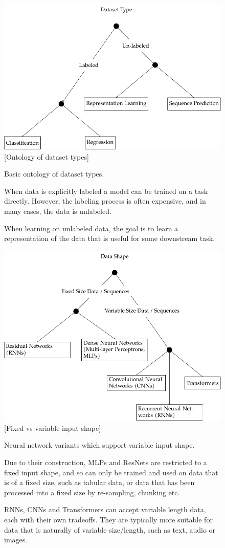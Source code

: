 \begin{figure}[h]
        \centering
        \includegraphics[width=.7\linewidth]{figures/ontology-2-task.pdf}
        \vspace{1cm}
        \captionsetup{parskip=7pt}
        [Ontology of dataset types]{
            Basic ontology of dataset types.

            When data is explicitly labeled a model can be trained on a task directly. However, the labeling process is often expensive, and in many cases, the data is unlabeled.

            When learning on unlabeled data, the goal is to learn a representation of the data that is useful for some downstream task.
        }
        \label{fig:ontology-task}
\end{figure}

\begin{figure}[h]
        \centering
        \includegraphics[width=.7\linewidth]{figures/ontology-3-input-shape.pdf}
        \vspace{1cm}
        \captionsetup{parskip=7pt}
        [Fixed vs variable input shape]{Neural network variants which support variable input shape.

        Due to their construction, MLPs and ResNets are restricted to a fixed input shape, and so can only be trained and used on data that is of a fixed size, such as tabular data, or data that has been processed into a fixed size by re-sampling, chunking etc.

        RNNs, CNNs and Transformers can accept variable length data, each with their own tradeoffs. They are typically more suitable for data that is naturally of variable size/length, such as text, audio or images.}
        \label{fig:ontology-input-shape}
\end{figure}


